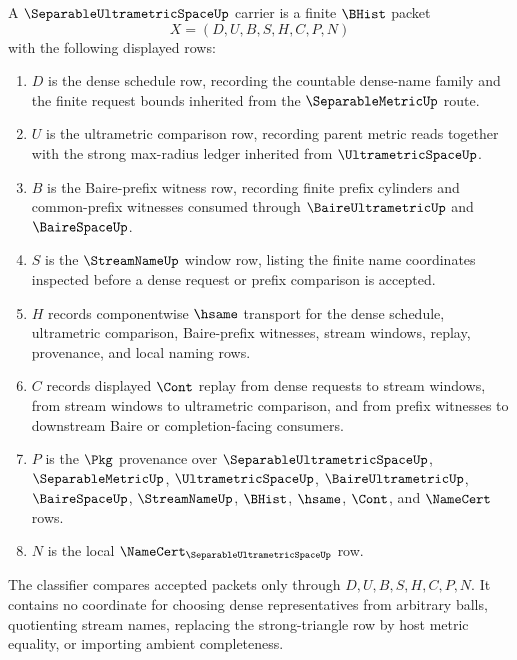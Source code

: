 \begin{definition}
\label{def:separable-ultrametric-space-carrier}
A $\SeparableUltrametricSpaceUp$ carrier is a finite $\BHist$ packet
$$
X=(D,U,B,S,H,C,P,N)
$$
with the following displayed rows:
\begin{enumerate}
\item $D$ is the dense schedule row, recording the countable dense-name family and the finite request bounds inherited from the $\SeparableMetricUp$ route.
\item $U$ is the ultrametric comparison row, recording parent metric reads together with the strong max-radius ledger inherited from $\UltrametricSpaceUp$.
\item $B$ is the Baire-prefix witness row, recording finite prefix cylinders and common-prefix witnesses consumed through $\BaireUltrametricUp$ and $\BaireSpaceUp$.
\item $S$ is the $\StreamNameUp$ window row, listing the finite name coordinates inspected before a dense request or prefix comparison is accepted.
\item $H$ records componentwise $\hsame$ transport for the dense schedule, ultrametric comparison, Baire-prefix witnesses, stream windows, replay, provenance, and local naming rows.
\item $C$ records displayed $\Cont$ replay from dense requests to stream windows, from stream windows to ultrametric comparison, and from prefix witnesses to downstream Baire or completion-facing consumers.
\item $P$ is the $\Pkg$ provenance over $\SeparableUltrametricSpaceUp$, $\SeparableMetricUp$, $\UltrametricSpaceUp$, $\BaireUltrametricUp$, $\BaireSpaceUp$, $\StreamNameUp$, $\BHist$, $\hsame$, $\Cont$, and $\NameCert$ rows.
\item $N$ is the local $\NameCert_{\SeparableUltrametricSpaceUp}$ row.
\end{enumerate}
The classifier compares accepted packets only through $D,U,B,S,H,C,P,N$. It contains no coordinate for choosing dense representatives from arbitrary balls, quotienting stream names, replacing the strong-triangle row by host metric equality, or importing ambient completeness.
\end{definition}

